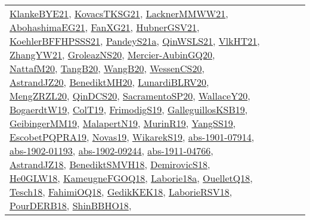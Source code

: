 {\begin{longtable}{llp{6cm}p{6cm}p{6cm}}
\href{papers/KlankeBYE21.pdf}{KlankeBYE21}\cite{KlankeBYE21}, \href{papers/KovacsTKSG21.pdf}{KovacsTKSG21}\cite{KovacsTKSG21}, \href{papers/LacknerMMWW21.pdf}{LacknerMMWW21}\cite{LacknerMMWW21}, \href{articles/AbohashimaEG21.pdf}{AbohashimaEG21}\cite{AbohashimaEG21}, \href{articles/FanXG21.pdf}{FanXG21}\cite{FanXG21}, \href{articles/HubnerGSV21.pdf}{HubnerGSV21}\cite{HubnerGSV21}, \href{articles/KoehlerBFFHPSSS21.pdf}{KoehlerBFFHPSSS21}\cite{KoehlerBFFHPSSS21}, \href{articles/PandeyS21a.pdf}{PandeyS21a}\cite{PandeyS21a}, \href{articles/QinWSLS21.pdf}{QinWSLS21}\cite{QinWSLS21}, \href{articles/VlkHT21.pdf}{VlkHT21}\cite{VlkHT21}, \href{articles/ZhangYW21.pdf}{ZhangYW21}\cite{ZhangYW21}, \href{papers/GroleazNS20.pdf}{GroleazNS20}\cite{GroleazNS20}, \href{papers/Mercier-AubinGQ20.pdf}{Mercier-AubinGQ20}\cite{Mercier-AubinGQ20}, \href{papers/NattafM20.pdf}{NattafM20}\cite{NattafM20}, \href{papers/TangB20.pdf}{TangB20}\cite{TangB20}, \href{papers/WangB20.pdf}{WangB20}\cite{WangB20}, \href{papers/WessenCS20.pdf}{WessenCS20}\cite{WessenCS20}, \href{articles/AstrandJZ20.pdf}{AstrandJZ20}\cite{AstrandJZ20}, \href{articles/BenediktMH20.pdf}{BenediktMH20}\cite{BenediktMH20}, \href{articles/LunardiBLRV20.pdf}{LunardiBLRV20}\cite{LunardiBLRV20}, \href{articles/MengZRZL20.pdf}{MengZRZL20}\cite{MengZRZL20}, \href{articles/QinDCS20.pdf}{QinDCS20}\cite{QinDCS20}, \href{articles/SacramentoSP20.pdf}{SacramentoSP20}\cite{SacramentoSP20}, \href{articles/WallaceY20.pdf}{WallaceY20}\cite{WallaceY20}, \href{papers/BogaerdtW19.pdf}{BogaerdtW19}\cite{BogaerdtW19}, \href{papers/ColT19.pdf}{ColT19}\cite{ColT19}, \href{papers/FrimodigS19.pdf}{FrimodigS19}\cite{FrimodigS19}, \href{papers/GalleguillosKSB19.pdf}{GalleguillosKSB19}\cite{GalleguillosKSB19}, \href{papers/GeibingerMM19.pdf}{GeibingerMM19}\cite{GeibingerMM19}, \href{papers/MalapertN19.pdf}{MalapertN19}\cite{MalapertN19}, \href{papers/MurinR19.pdf}{MurinR19}\cite{MurinR19}, \href{papers/YangSS19.pdf}{YangSS19}\cite{YangSS19}, \href{articles/EscobetPQPRA19.pdf}{EscobetPQPRA19}\cite{EscobetPQPRA19}, \href{articles/Novas19.pdf}{Novas19}\cite{Novas19}, \href{articles/WikarekS19.pdf}{WikarekS19}\cite{WikarekS19}, \href{articles/abs-1901-07914.pdf}{abs-1901-07914}\cite{abs-1901-07914}, \href{articles/abs-1902-01193.pdf}{abs-1902-01193}\cite{abs-1902-01193}, \href{articles/abs-1902-09244.pdf}{abs-1902-09244}\cite{abs-1902-09244}, \href{articles/abs-1911-04766.pdf}{abs-1911-04766}\cite{abs-1911-04766}, \href{papers/AstrandJZ18.pdf}{AstrandJZ18}\cite{AstrandJZ18}, \href{papers/BenediktSMVH18.pdf}{BenediktSMVH18}\cite{BenediktSMVH18}, \href{papers/DemirovicS18.pdf}{DemirovicS18}\cite{DemirovicS18}, \href{papers/He0GLW18.pdf}{He0GLW18}\cite{He0GLW18}, \href{papers/KameugneFGOQ18.pdf}{KameugneFGOQ18}\cite{KameugneFGOQ18}, \href{papers/Laborie18a.pdf}{Laborie18a}\cite{Laborie18a}, \href{papers/OuelletQ18.pdf}{OuelletQ18}\cite{OuelletQ18}, \href{papers/Tesch18.pdf}{Tesch18}\cite{Tesch18}, \href{articles/FahimiOQ18.pdf}{FahimiOQ18}\cite{FahimiOQ18}, \href{articles/GedikKEK18.pdf}{GedikKEK18}\cite{GedikKEK18}, \href{articles/LaborieRSV18.pdf}{LaborieRSV18}\cite{LaborieRSV18}, \href{articles/PourDERB18.pdf}{PourDERB18}\cite{PourDERB18}, \href{articles/ShinBBHO18.pdf}{ShinBBHO18}\cite{ShinBBHO18}, 
\end{longtable}}
